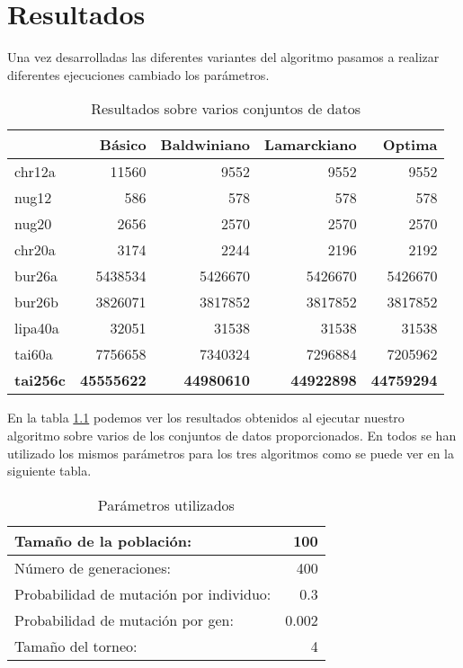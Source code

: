 \chapter{Resultados}

Una vez desarrolladas las diferentes variantes del algoritmo pasamos a realizar diferentes ejecuciones cambiado los parámetros.


\begin{table}[ht!]
\centering
\label{resultados_algunas_bd}
\begin{tabular}{ l | r r r | r}
 & \textbf{Básico} & \textbf{Baldwiniano} & \textbf{Lamarckiano} & \textbf{Optima}  \\ \hline
  
chr12a  &  11560 & 9552 & 9552 & 9552 \\
nug12   &  586 & 578 & 578 & 578 \\
nug20   &  2656 & 2570 & 2570 & 2570 \\
chr20a  &  3174 & 2244 & 2196 & 2192 \\
bur26a  &  5438534 & 5426670 & 5426670  & 5426670 \\
bur26b  &  3826071 & 3817852 & 3817852  & 3817852 \\
lipa40a  &  32051 & 31538 & 31538 & 31538 \\
tai60a  &  7756658 & 7340324 & 7296884 & 7205962 \\
\textbf{tai256c} &  \textbf{45555622} & \textbf{44980610} & \textbf{44922898}  & \textbf{44759294}\\

\end{tabular}
\caption{Resultados sobre varios conjuntos de datos}
\end{table}

En la tabla \ref{resultados_algunas_bd} podemos ver los resultados obtenidos al ejecutar nuestro algoritmo sobre varios de los conjuntos de datos proporcionados. En todos se han utilizado los mismos parámetros para los tres algoritmos como se puede ver en la siguiente tabla.

\begin{table}[ht!]
\centering

\label{parametros}
\begin{tabular}{ l r }
Tamaño de la población: & 100\\ \hline
Número de generaciones: & 400\\ \hline
Probabilidad de mutación por individuo: & 0.3\\ \hline
Probabilidad de mutación por gen: & 0.002\\ \hline
Tamaño del torneo: & 4\\ \hline

\end{tabular}
\caption{Parámetros utilizados}
\end{table}

